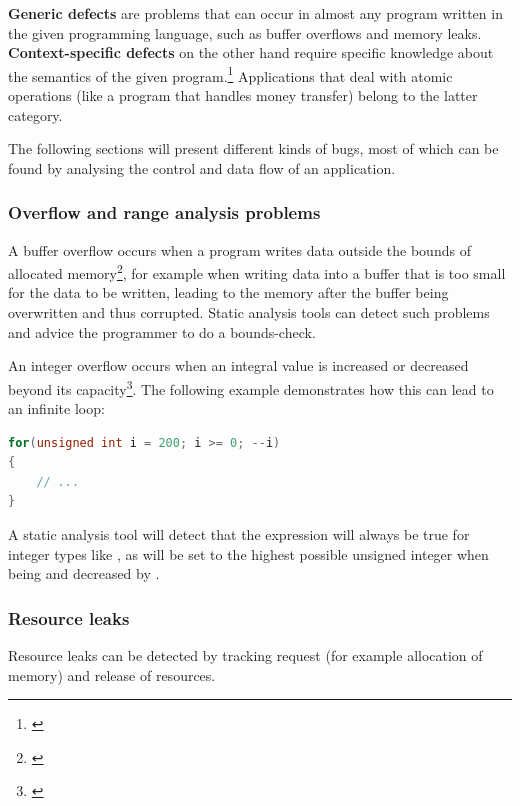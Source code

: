 \textbf{Generic defects} are problems that can occur in almost any program written in the given programming language, such as buffer overflows and memory leaks.\\
\textbf{Context-specific defects} on the other hand require specific knowledge about the semantics of the given program.\footnote{\citep[14]{SecureProgramming}} Applications that deal with atomic operations (like a program that handles money transfer) belong to the latter category.

The following sections will present different kinds of bugs, most of which can be found by analysing the control and data flow of an application.

\subsubsection{Overflow and range analysis problems}

A buffer overflow occurs when a program writes data outside the bounds of allocated memory\footnote{\citep[175]{SecureProgramming}}, for example when writing data into a buffer that is too small for the data to be written, leading to the memory after the buffer being overwritten and thus corrupted. Static analysis tools can detect such problems and advice the programmer to do a bounds-check.

An integer overflow occurs when an integral value is increased or decreased beyond its capacity\footnote{\citep[235]{SecureProgramming}}. The following example demonstrates how this can lead to an infinite loop:

\SingleSpacing
\begin{lstlisting}[language=C++, caption=Integer \mySlang{underflow} in \myProperName{C++}]
for(unsigned int i = 200; i >= 0; --i)
{
	// ...
}
\end{lstlisting}
\OnehalfSpacing

A static analysis tool will detect that the expression  will always be true for  integer types like , as  will be set to the highest possible unsigned integer when being  and decreased by .

\subsubsection{Resource leaks}

Resource leaks can be detected by tracking request (for example allocation of memory) and release of resources.


